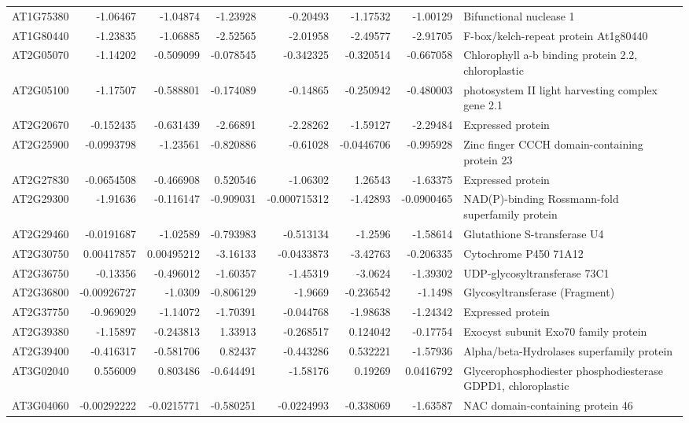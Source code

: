 \documentclass[11pt]{article}
\begin{document}
\begin{center}
\begin{tabular}{lrrrrrrl}
AT1G75380 & -1.06467 & -1.04874 & -1.23928 & -0.20493 & -1.17532 & -1.00129 & Bifunctional nuclease 1\\
AT1G80440 & -1.23835 & -1.06885 & -2.52565 & -2.01958 & -2.49577 & -2.91705 & F-box/kelch-repeat protein At1g80440\\
AT2G05070 & -1.14202 & -0.509099 & -0.078545 & -0.342325 & -0.320514 & -0.667058 & Chlorophyll a-b binding protein 2.2, chloroplastic\\
AT2G05100 & -1.17507 & -0.588801 & -0.174089 & -0.14865 & -0.250942 & -0.480003 & photosystem II light harvesting complex gene 2.1\\
AT2G20670 & -0.152435 & -0.631439 & -2.66891 & -2.28262 & -1.59127 & -2.29484 & Expressed protein\\
AT2G25900 & -0.0993798 & -1.23561 & -0.820886 & -0.61028 & -0.0446706 & -0.995928 & Zinc finger CCCH domain-containing protein 23\\
AT2G27830 & -0.0654508 & -0.466908 & 0.520546 & -1.06302 & 1.26543 & -1.63375 & Expressed protein\\
AT2G29300 & -1.91636 & -0.116147 & -0.909031 & -0.000715312 & -1.42893 & -0.0900465 & NAD(P)-binding Rossmann-fold superfamily protein\\
AT2G29460 & -0.0191687 & -1.02589 & -0.793983 & -0.513134 & -1.2596 & -1.58614 & Glutathione S-transferase U4\\
AT2G30750 & 0.00417857 & 0.00495212 & -3.16133 & -0.0433873 & -3.42763 & -0.206335 & Cytochrome P450 71A12\\
AT2G36750 & -0.13356 & -0.496012 & -1.60357 & -1.45319 & -3.0624 & -1.39302 & UDP-glycosyltransferase 73C1\\
AT2G36800 & -0.00926727 & -1.0309 & -0.806129 & -1.9669 & -0.236542 & -1.1498 & Glycosyltransferase (Fragment)\\
AT2G37750 & -0.969029 & -1.14072 & -1.70391 & -0.044768 & -1.98638 & -1.24342 & Expressed protein\\
AT2G39380 & -1.15897 & -0.243813 & 1.33913 & -0.268517 & 0.124042 & -0.17754 & Exocyst subunit Exo70 family protein\\
AT2G39400 & -0.416317 & -0.581706 & 0.82437 & -0.443286 & 0.532221 & -1.57936 & Alpha/beta-Hydrolases superfamily protein\\
AT3G02040 & 0.556009 & 0.803486 & -0.644491 & -1.58176 & 0.19269 & 0.0416792 & Glycerophosphodiester phosphodiesterase GDPD1, chloroplastic\\
AT3G04060 & -0.00292222 & -0.0215771 & -0.580251 & -0.0224993 & -0.338069 & -1.63587 & NAC domain-containing protein 46\\

\end{tabular}
\end{center}
\end{document}
